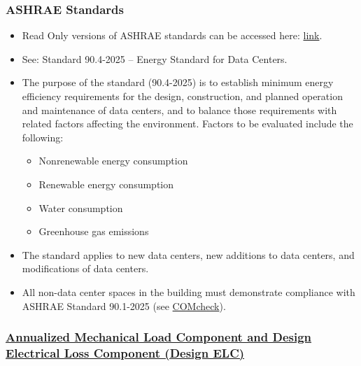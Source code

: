 \documentclass[aspectratio=169,10pt,xcolor={table,dvipsnames},t]{beamer}
\begin{document}
{
\smallframetitle
\begin{frame}
	\frametitle{ASHRAE Standards}
		\begin{itemize}
			\item Read Only versions of ASHRAE standards can be accessed here: \href{https://www.ashrae.org/technical-resources/standards-and-guidelines/read-only-versions-of-ashrae-standards}{link}.
			\item See: Standard 90.4-2025 -- Energy Standard for Data Centers. 
			\item The purpose of the standard (90.4-2025) is to establish minimum energy efficiency requirements for the design, construction, and planned operation and maintenance of data centers, and to balance those requirements with related factors affecting the environment. Factors to be evaluated include the following: 
			\begin{itemize}
				\vspace{-0.3cm}
				\item Nonrenewable energy consumption
				\item Renewable energy consumption
				\item Water consumption
				\item Greenhouse gas emissions				
			\end{itemize}
			\item The standard applies to new data centers, new additions to data centers, and modifications of data centers. 
			\item All non-data center spaces in the building must demonstrate compliance with ASHRAE Standard 90.1-2025 (see \href{https://www.energycodes.gov/comcheck}{COMcheck}).
		\end{itemize}
\end{frame}
}

{
\smallframetitle
\begin{frame}
	\frametitle{\href{https://datahub.berkeley.edu/user-redirect/git-pull?repo=https://github.com/mtsn-lab/me137-237a&subPath=examples/ashrae90-4-2025/ashrae90-4-2025.ipynb}{Annualized Mechanical Load Component and Design Electrical Loss Component (Design ELC)}}

\end{frame}
}
\end{document}
